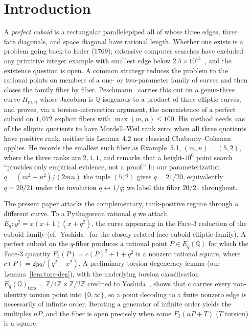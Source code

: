 \documentclass[11pt,reqno]{amsart}
\theoremstyle{plain}
\theoremstyle{definition}
\newcommand{\Q}{\mathbb{Q}}
\newcommand{\Z}{\mathbb{Z}}
\begin{document}
\maketitle

\section{Introduction}

A \emph{perfect cuboid} is a rectangular parallelepiped all of whose three
edges, three face diagonals, and space diagonal have rational length. Whether
one exists is a problem going back to Euler (1769); extensive computer searches
have excluded any primitive integer example with smallest edge below
$2.5\times10^{13}$~\cite{matson}, and the existence question is open. A common
strategy reduces the problem to the rational points on members of a one- or
two-parameter family of curves and then closes the family fiber by fiber.
Peschmann~\cite{peschmann1} carries this out on a genus-three curve $H_{m,n}$
whose Jacobian is $\Q$-isogenous to a product of three elliptic curves, and
proves, via a torsion-intersection argument, the nonexistence of a perfect
cuboid on $1{,}072$ explicit fibers with $\max(m,n)\le 100$. His method needs
\emph{one} of the elliptic quotients to have Mordell--Weil rank zero; when all
three quotients have positive rank, neither his Lemma~4.2 nor classical
Chabauty--Coleman applies. He records the smallest such fiber as Example~5.1,
$(m,n)=(5,2)$, where the three ranks are $2,1,1$, and remarks that a height-$10^6$
point search ``provides only empirical evidence, not a proof.'' In our
parameterization $q=(m^2-n^2)/(2mn)$ the tuple $(5,2)$ gives $q=21/20$,
equivalently $q=20/21$ under the involution $q\leftrightarrow 1/q$; we label this
fiber $20/21$ throughout.

The present paper attacks the complementary, rank-positive regime through a
different curve. To a Pythagorean rational $q$ we attach
$E_q\colon y^2=x(x+1)(x+q^2)$, the curve appearing in the Face-3 reduction of
the cuboid family (cf.\ Yoshida~\cite{yoshida} for the closely related face-cuboid
elliptic family). A perfect cuboid on the $q$-fiber produces a rational point
$P\in E_q(\Q)$ for which the Face-3 quantity $F_3(P)=c(P)^2+1+q^2$ is a nonzero
rational square, where $c(P)=2yq/(q^2-x^2)$. A preliminary torsion-degeneracy
lemma (our Lemma~\ref{lem:tors-deg}), with the underlying torsion classification
$E_q(\Q)_{\mathrm{tors}}=\Z/4\Z\times\Z/2\Z$ credited to
Yoshida~\cite[Lemma~2.1]{yoshida}, shows that $c$ carries every non-identity
torsion point into $\{0,\infty\}$, so a point decoding to a finite nonzero edge
is necessarily of infinite order. Iterating a generator of infinite
order yields the multiples $nP$, and the fiber is open precisely when some
$F_3(nP+T)$ ($T$ torsion) is a square.
\end{document}
